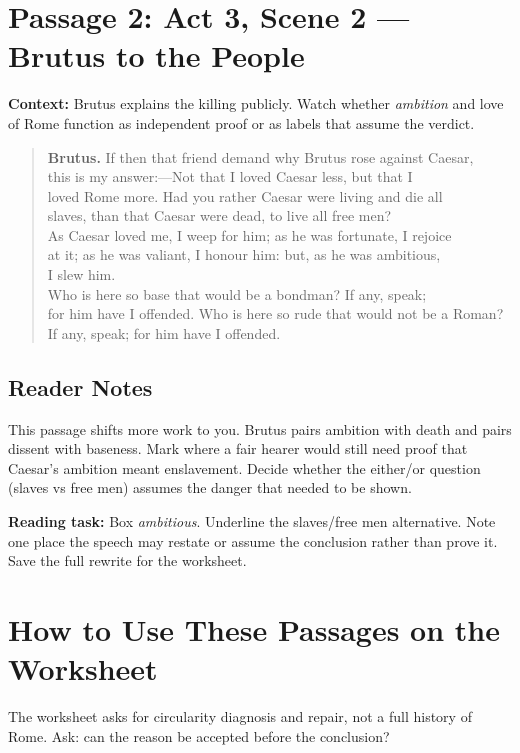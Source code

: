 \documentclass[12pt]{article}
\newenvironment{playpassage}{\begin{quote}\footnotesize\setlength{\parskip}{0.08em}\setlength{\parindent}{0pt}}{\end{quote}}
\newcommand{\speaker}[1]{\textbf{#1.}}
\begin{document}
\section*{Passage 2: Act 3, Scene 2 --- Brutus to the People}

\textbf{Context:} Brutus explains the killing publicly. Watch whether \textit{ambition} and love of Rome function as independent proof or as labels that assume the verdict.

\begin{playpassage}
\speaker{Brutus} If then that friend demand why Brutus rose against Caesar,\\
this is my answer:---Not that I loved Caesar less, but that I\\
loved Rome more. Had you rather Caesar were living and die all\\
slaves, than that Caesar were dead, to live all free men?\\
As Caesar loved me, I weep for him; as he was fortunate, I rejoice\\
at it; as he was valiant, I honour him: but, as he was ambitious,\\
I slew him.\\
Who is here so base that would be a bondman? If any, speak;\\
for him have I offended. Who is here so rude that would not be a Roman?\\
If any, speak; for him have I offended.
\end{playpassage}

\subsection*{Reader Notes}

This passage shifts more work to you. Brutus pairs ambition with death and pairs dissent with baseness. Mark where a fair hearer would still need proof that Caesar's ambition meant enslavement. Decide whether the either/or question (slaves vs free men) assumes the danger that needed to be shown.

\textbf{Reading task:} Box \textit{ambitious}. Underline the slaves/free men alternative. Note one place the speech may restate or assume the conclusion rather than prove it. Save the full rewrite for the worksheet.

\section*{How to Use These Passages on the Worksheet}

The worksheet asks for circularity diagnosis and repair, not a full history of Rome. Ask: can the reason be accepted before the conclusion?
\end{document}
